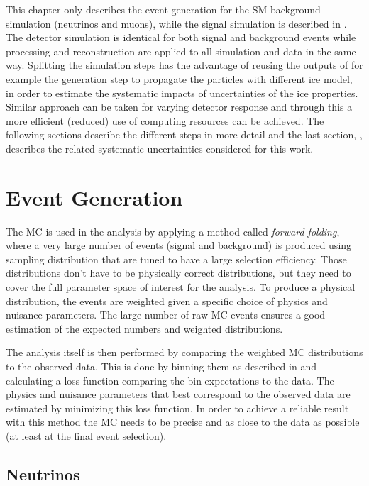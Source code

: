 This chapter only describes the event generation for the SM background simulation (neutrinos and muons), while the signal simulation is described in . The detector simulation is identical for both signal and background events while processing and reconstruction are applied to all simulation and data in the same way. Splitting the simulation steps has the advantage of reusing the outputs of for example the generation step to propagate the particles with different ice model, in order to estimate the systematic impacts of uncertainties of the ice properties. Similar approach can be taken for varying detector response and through this a more efficient (reduced) use of computing resources can be achieved. The following sections describe the different steps in more detail and the last section, , describes the related systematic uncertainties considered for this work.


\section{Event Generation} 

The MC is used in the analysis by applying a method called \textit{forward folding}, where a very large number of events (signal and background) is produced using sampling distribution that are tuned to have a large selection efficiency. Those distributions don't have to be physically correct distributions, but they need to cover the full parameter space of interest for the analysis. To produce a physical distribution, the events are weighted given a specific choice of physics and nuisance parameters. The large number of raw MC events ensures a good estimation of the expected numbers and weighted distributions. 

The analysis itself is then performed by comparing the weighted MC distributions to the observed data. This is done by binning them as described in  and calculating a loss function comparing the bin expectations to the data. The physics and nuisance parameters that best correspond to the observed data are estimated by minimizing this loss function. In order to achieve a reliable result with this method the MC needs to be precise and as close to the data as possible (at least at the final event selection). 


\subsection{Neutrinos} 

